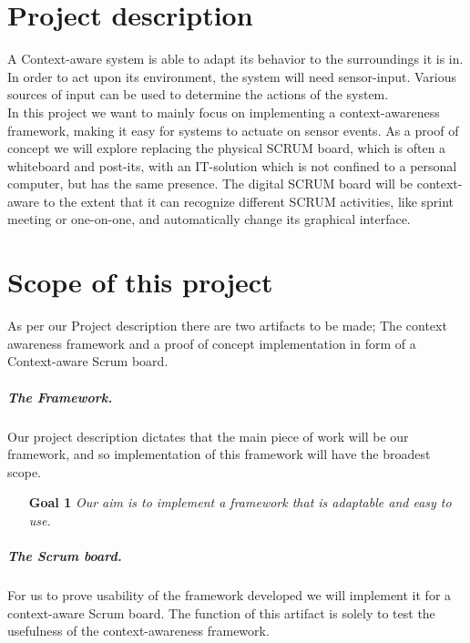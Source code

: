 \documentclass[]{report}
\begin{document}
\graphicspath{{img/}{../img/}}


\begin{abstract}
\end{abstract}


\chapter{Project description}
A Context-aware system is able to adapt its behavior to the surroundings it is in. In order to act upon its environment, the system will need sensor-input. Various sources of input can be used to determine the actions of the system.\\

In this project we want to mainly focus on implementing a context-awareness framework, making it easy for systems to actuate on sensor events. As a proof of concept we will explore replacing the physical SCRUM board, which is often a whiteboard and post-its, with an IT-solution which is not confined to a personal computer, but has the same presence. The digital SCRUM board will be context-aware to the extent that it can recognize different SCRUM activities, like sprint meeting or one-on-one, and automatically change its graphical interface.


\chapter{Scope of this project}

As per our Project description there are two artifacts to be made; The context awareness framework and a proof of concept implementation in form of a Context-aware Scrum board.

\paragraph{The Framework.} 
Our project description dictates that the main piece of work will be our framework, and so implementation of this framework will have the broadest scope.\\

\begin{itemize}
\item[\textbf{Goal 1 }] \textit{Our aim is to implement a framework that is adaptable and easy to use.}
\end{itemize}


\paragraph{The Scrum board.} 
For us to prove usability of the framework developed we will implement it for a context-aware Scrum board. The function of this artifact is solely to test the usefulness of the context-awareness framework.\\
\end{document}
